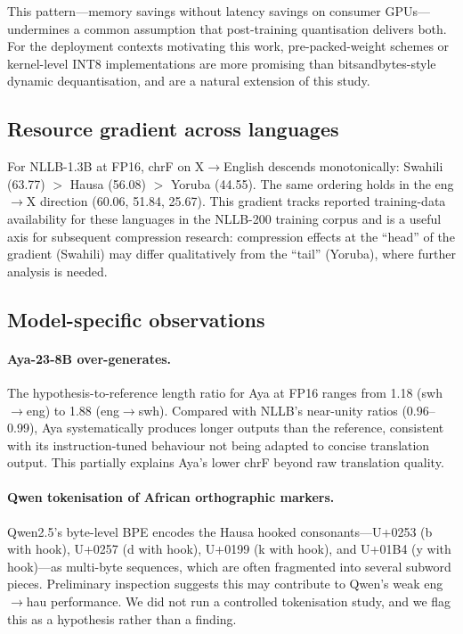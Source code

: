 \documentclass[11pt,a4paper]{article}
\begin{document}
This pattern---memory savings without latency savings on consumer
GPUs---undermines a common assumption that post-training quantisation
delivers both. For the deployment contexts motivating this work,
pre-packed-weight schemes \cite{frantar2023gptq,lin2024awq} or
kernel-level INT8 implementations are more promising than
bitsandbytes-style dynamic dequantisation, and are a natural extension
of this study.

\subsection{Resource gradient across languages}

For NLLB-1.3B at FP16, chrF on X$\rightarrow$English descends
monotonically: Swahili (63.77) $>$ Hausa (56.08) $>$ Yoruba (44.55).
The same ordering holds in the eng$\rightarrow$X direction (60.06,
51.84, 25.67). This gradient tracks reported training-data availability
for these languages in the NLLB-200 training corpus
\cite{nllb2024nature} and is a useful axis for subsequent compression
research: compression effects at the ``head'' of the gradient
(Swahili) may differ qualitatively from the ``tail'' (Yoruba), where
further analysis is needed.

\subsection{Model-specific observations}

\paragraph{Aya-23-8B over-generates.}
The hypothesis-to-reference length ratio for Aya at FP16 ranges from
1.18 (swh$\rightarrow$eng) to 1.88 (eng$\rightarrow$swh). Compared with
NLLB's near-unity ratios (0.96--0.99), Aya systematically produces
longer outputs than the reference, consistent with its
instruction-tuned behaviour not being adapted to concise translation
output. This partially explains Aya's lower chrF beyond raw translation
quality.

\paragraph{Qwen tokenisation of African orthographic markers.}
Qwen2.5's byte-level BPE encodes the Hausa hooked consonants---U+0253
(b with hook), U+0257 (d with hook), U+0199 (k with hook), and U+01B4
(y with hook)---as multi-byte sequences, which are often fragmented
into several subword pieces. Preliminary inspection suggests this may
contribute to Qwen's weak eng$\rightarrow$hau performance. We did not
run a controlled tokenisation study, and we flag this as a hypothesis
rather than a finding.
\end{document}

